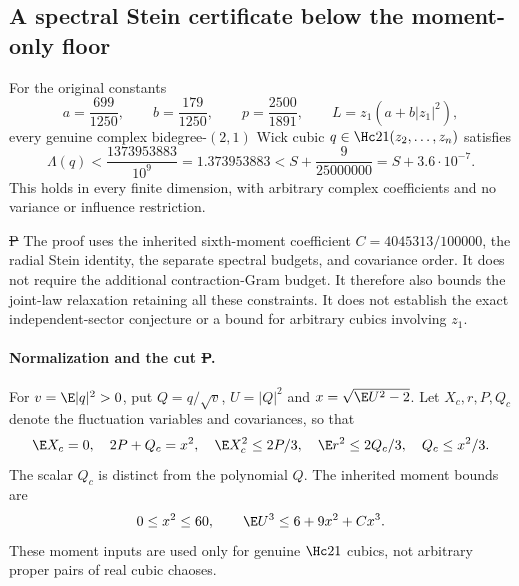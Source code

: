 \subsection{A spectral Stein certificate below the moment-only floor}
\label{sec:independent-stein-36e-8}

\begin{theorem}
\label{thm:independent-stein-36e-8}
For the original constants
\[
 a=\frac{699}{1250},\qquad b=\frac{179}{1250},\qquad
 p=\frac{2500}{1891},\qquad L=z_1(a+b|z_1|^2),
\]
every genuine complex bidegree-\((2,1)\) Wick cubic
$q\in\Hc21(z_2,\ldots,z_n)$ satisfies
\[
 \boxed{\Lambda(q)<\frac{1373953883}{10^9}
       =1.373953883<S+\frac9{25000000}
       =S+3.6\cdot10^{-7}.}
\]
This holds in every finite dimension, with arbitrary complex coefficients
and no variance or influence restriction.
\end{theorem}

\noindent
\st{P} The proof uses the inherited sixth-moment coefficient
$C=4045313/100000$, the radial Stein identity, the separate spectral
budgets, and covariance order. It does not require the additional
contraction-Gram budget. It therefore also bounds the joint-law
relaxation retaining all these constraints. It does not establish
the exact independent-sector conjecture or a bound for arbitrary
cubics involving $z_1$.

\paragraph{Normalization and the cut \st{P}.}
For $v=\E|q|^2>0$, put $Q=q/\sqrt v$, $U=|Q|^2$ and
$x=\sqrt{\E U^2-2}$. Let $X_c,r,P,Q_c$ denote the fluctuation
variables and covariances, so that
\[
 \E X_c=0,\quad 2P+Q_c=x^2,\quad
 \E X_c^2\le2P/3,\quad \E r^2\le2Q_c/3,\quad Q_c\le x^2/3.
\]
The scalar $Q_c$ is distinct from the polynomial $Q$.
The inherited moment bounds are
\[
 0\le x^2\le60,\qquad
 \E U^3\le6+9x^2+Cx^3.
\]
These moment inputs are used only for genuine $\Hc21$ cubics,
not arbitrary proper pairs of real cubic chaoses.

